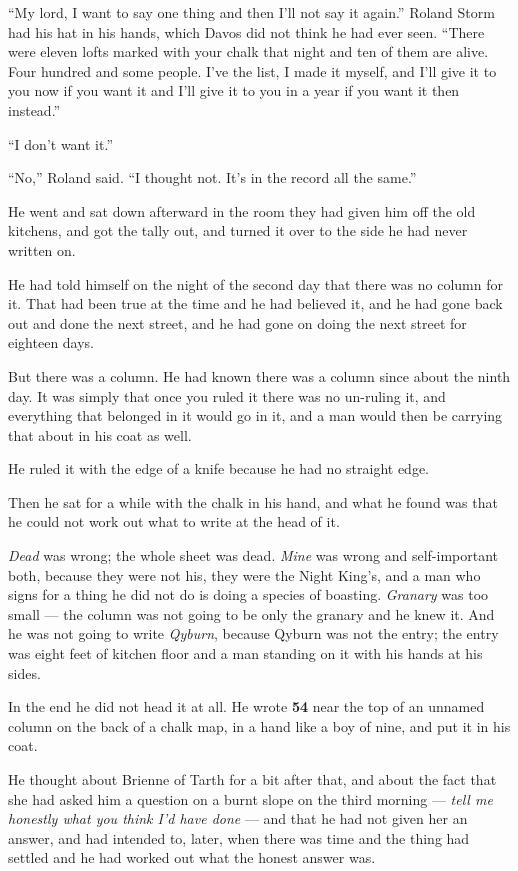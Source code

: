 “My lord, I want to say one thing and then I’ll not say it again.” Roland Storm had his hat in his hands, which Davos did not think he had ever seen. “There were eleven lofts marked with your chalk that night and ten of them are alive. Four hundred and some people. I’ve the list, I made it myself, and I’ll give it to you now if you want it and I’ll give it to you in a year if you want it then instead.”

“I don’t want it.”

“No,” Roland said. “I thought not. It’s in the record all the same.”

\sceneBreak

He went and sat down afterward in the room they had given him off the old kitchens, and got the tally out, and turned it over to the side he had never written on.

He had told himself on the night of the second day that there was no column for it. That had been true at the time and he had believed it, and he had gone back out and done the next street, and he had gone on doing the next street for eighteen days.

But there was a column. He had known there was a column since about the ninth day. It was simply that once you ruled it there was no un-ruling it, and everything that belonged in it would go in it, and a man would then be carrying that about in his coat as well.

He ruled it with the edge of a knife because he had no straight edge.

Then he sat for a while with the chalk in his hand, and what he found was that he could not work out what to write at the head of it.

\textit{Dead} was wrong; the whole sheet was dead. \textit{Mine} was wrong and self-important both, because they were not his, they were the Night King’s, and a man who signs for a thing he did not do is doing a species of boasting. \textit{Granary} was too small — the column was not going to be only the granary and he knew it. And he was not going to write \textit{Qyburn}, because Qyburn was not the entry; the entry was eight feet of kitchen floor and a man standing on it with his hands at his sides.

In the end he did not head it at all. He wrote \textbf{54} near the top of an unnamed column on the back of a chalk map, in a hand like a boy of nine, and put it in his coat.

He thought about Brienne of Tarth for a bit after that, and about the fact that she had asked him a question on a burnt slope on the third morning — \textit{tell me honestly what you think I’d have done} — and that he had not given her an answer, and had intended to, later, when there was time and the thing had settled and he had worked out what the honest answer was.

